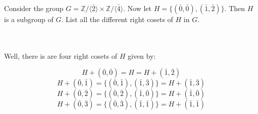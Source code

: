 Consider the group $G=\mathbb{Z}/\langle\bar{2}\rangle\times\mathbb{Z}/\langle\bar{4}\rangle$. Now let
$H=\{(\bar{0},\bar{0}), (\bar{1},\bar{2})\}$. Then $H$ is a subgroup of $G$. List all the different
right cosets of $H$ in $G$.\\\\

\begin{solution}\renewcommand{\qedsymbol}{}\ \\
    Well, there is  are four right cosets of $H$ given by:
    
    $$H+(\bar{0},\bar{0})=H=H+(\bar{1},\bar{2})$$
    $$H+(\bar{0},\bar{1})=\{(\bar{0},\bar{1}),(\bar{1},\bar{3})\}=H+(\bar{1},\bar{3})$$
    $$H+(\bar{0},\bar{2})=\{(\bar{0},\bar{2}),(\bar{1},\bar{0})\}=H+(\bar{1},\bar{0})$$
    $$H+(\bar{0},\bar{3})=\{(\bar{0},\bar{3}),(\bar{1},\bar{1})\}=H+(\bar{1},\bar{1})$$

\end{solution}
